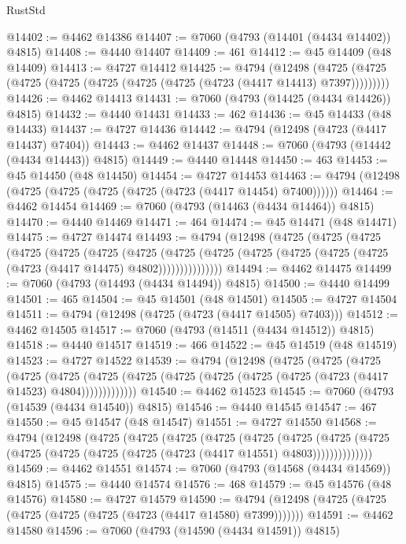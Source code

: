 \begin{lexlean}{RustStd}
\begin{coremodule}
{\begin{coremodule}
{{{{{{{{{{{{{{{{{{{{{{{{{{{{{{{{{{{{{{{{{{{{{{{{{{{{{{{{{{{{@14402 := @4462 @14386
@14407 := @7060 (@4793 (@14401 (@4434 @14402)) @4815)
@14408 := @4440 @14407
@14409 := 461
@14412 := @45 @14409 (@48 @14409)
@14413 := @4727 @14412
@14425 := @4794
    (@12498 (@4725 (@4725 (@4725 (@4725 (@4725 (@4725 (@4725 (@4723 (@4417 @14413) @7397)))))))))
@14426 := @4462 @14413
@14431 := @7060 (@4793 (@14425 (@4434 @14426)) @4815)
@14432 := @4440 @14431
@14433 := 462
@14436 := @45 @14433 (@48 @14433)
@14437 := @4727 @14436
@14442 := @4794 (@12498 (@4723 (@4417 @14437) @7404))
@14443 := @4462 @14437
@14448 := @7060 (@4793 (@14442 (@4434 @14443)) @4815)
@14449 := @4440 @14448
@14450 := 463
@14453 := @45 @14450 (@48 @14450)
@14454 := @4727 @14453
@14463 := @4794 (@12498 (@4725 (@4725 (@4725 (@4725 (@4723 (@4417 @14454) @7400))))))
@14464 := @4462 @14454
@14469 := @7060 (@4793 (@14463 (@4434 @14464)) @4815)
@14470 := @4440 @14469
@14471 := 464
@14474 := @45 @14471 (@48 @14471)
@14475 := @4727 @14474
@14493 := @4794
    (@12498
      (@4725
        (@4725
          (@4725
            (@4725
              (@4725
                (@4725
                  (@4725
                    (@4725
                      (@4725 (@4725 (@4725 (@4725 (@4725 (@4723 (@4417 @14475) @4802)))))))))))))))
@14494 := @4462 @14475
@14499 := @7060 (@4793 (@14493 (@4434 @14494)) @4815)
@14500 := @4440 @14499
@14501 := 465
@14504 := @45 @14501 (@48 @14501)
@14505 := @4727 @14504
@14511 := @4794 (@12498 (@4725 (@4723 (@4417 @14505) @7403)))
@14512 := @4462 @14505
@14517 := @7060 (@4793 (@14511 (@4434 @14512)) @4815)
@14518 := @4440 @14517
@14519 := 466
@14522 := @45 @14519 (@48 @14519)
@14523 := @4727 @14522
@14539 := @4794
    (@12498
      (@4725
        (@4725
          (@4725
            (@4725
              (@4725
                (@4725 (@4725 (@4725 (@4725 (@4725 (@4725 (@4723 (@4417 @14523) @4804)))))))))))))
@14540 := @4462 @14523
@14545 := @7060 (@4793 (@14539 (@4434 @14540)) @4815)
@14546 := @4440 @14545
@14547 := 467
@14550 := @45 @14547 (@48 @14547)
@14551 := @4727 @14550
@14568 := @4794
    (@12498
      (@4725
        (@4725
          (@4725
            (@4725
              (@4725
                (@4725
                  (@4725
                    (@4725 (@4725 (@4725 (@4725 (@4725 (@4723 (@4417 @14551) @4803))))))))))))))
@14569 := @4462 @14551
@14574 := @7060 (@4793 (@14568 (@4434 @14569)) @4815)
@14575 := @4440 @14574
@14576 := 468
@14579 := @45 @14576 (@48 @14576)
@14580 := @4727 @14579
@14590 := @4794 (@12498 (@4725 (@4725 (@4725 (@4725 (@4725 (@4723 (@4417 @14580) @7399)))))))
@14591 := @4462 @14580
@14596 := @7060 (@4793 (@14590 (@4434 @14591)) @4815)
}}}}}}}}}}}}}}}}}}}}}}}}}}}}}}}}}}}}}}}}}}}}}}}}}}}}}}}}}}}}
\end{coremodule}}
\end{coremodule}
\end{lexlean}
